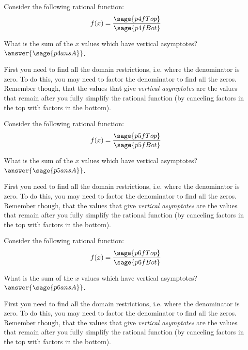 \documentclass{ximera}
\begin{document}
\begin{problem}
    Consider the following rational function:
    \[
        f(x) = \frac{\sage{p4fTop}}{\sage{p4fBot}}
    \]
    
    What is the sum of the $x$ values which have vertical asymptotes? $\answer{\sage{p4ansA}}$.
    \begin{feedback}
        First you need to find all the domain restrictions, i.e. where the denominator is zero. To do this, you may need to factor the denominator to find all the zeros. Remember though, that the values that give \textit{vertical asymptotes} are the values that remain after you fully simplify the rational function (by canceling factors in the top with factors in the bottom).
    \end{feedback}
\end{problem}




\begin{problem}
    Consider the following rational function:
    \[
        f(x) = \frac{\sage{p5fTop}}{\sage{p5fBot}}
    \]
    
    What is the sum of the $x$ values which have vertical asymptotes? $\answer{\sage{p5ansA}}$.
    \begin{feedback}
        First you need to find all the domain restrictions, i.e. where the denominator is zero. To do this, you may need to factor the denominator to find all the zeros. Remember though, that the values that give \textit{vertical asymptotes} are the values that remain after you fully simplify the rational function (by canceling factors in the top with factors in the bottom).
    \end{feedback}
\end{problem}




\begin{problem}
    Consider the following rational function:
    \[
        f(x) = \frac{\sage{p6fTop}}{\sage{p6fBot}}
    \]
    
    What is the sum of the $x$ values which have vertical asymptotes? $\answer{\sage{p6ansA}}$.
    \begin{feedback}
        First you need to find all the domain restrictions, i.e. where the denominator is zero. To do this, you may need to factor the denominator to find all the zeros. Remember though, that the values that give \textit{vertical asymptotes} are the values that remain after you fully simplify the rational function (by canceling factors in the top with factors in the bottom).
    \end{feedback}
\end{problem}
\end{document}
